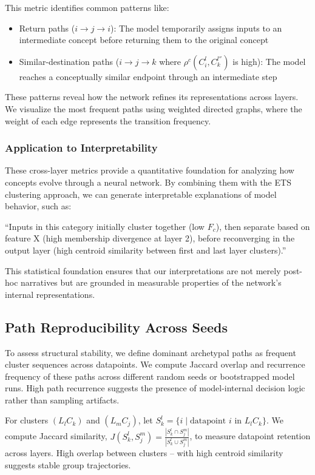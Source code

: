 This metric identifies common patterns like:
\begin{itemize}
    \item Return paths ($i \rightarrow j \rightarrow i$): The model temporarily assigns inputs to an intermediate concept before returning them to the original concept
    \item Similar-destination paths ($i \rightarrow j \rightarrow k$ where $\rho^c(C_i^l, C_k^{l''})$ is high): The model reaches a conceptually similar endpoint through an intermediate step
\end{itemize}

These patterns reveal how the network refines its representations across layers. We visualize the most frequent paths using weighted directed graphs, where the weight of each edge represents the transition frequency.

\subsubsection{Application to Interpretability}

These cross-layer metrics provide a quantitative foundation for analyzing how concepts evolve through a neural network. By combining them with the ETS clustering approach, we can generate interpretable explanations of model behavior, such as:

``Inputs in this category initially cluster together (low $F_c$), then separate based on feature X (high membership divergence at layer 2), before reconverging in the output layer (high centroid similarity between first and last layer clusters).''

This statistical foundation ensures that our interpretations are not merely post-hoc narratives but are grounded in measurable properties of the network's internal representations.

\subsection{Path Reproducibility Across Seeds}

To assess structural stability, we define dominant archetypal paths as frequent cluster sequences across datapoints. We compute Jaccard overlap and recurrence frequency of these paths across different random seeds or bootstrapped model runs. High path recurrence suggests the presence of model-internal decision logic rather than sampling artifacts. 

For clusters $(L_lC_k)$ and $(L_mC_j)$, let $S_k^l = \{i \mid \text{datapoint } i \text{ in } L_lC_k\}$. We compute Jaccard similarity, $J(S_k^l, S_j^m) = \frac{|S_k^l \cap S_j^m|}{|S_k^l \cup S_j^m|}$, to measure datapoint retention across layers. High overlap between clusters -- with high centroid similarity suggests stable group trajectories. 

